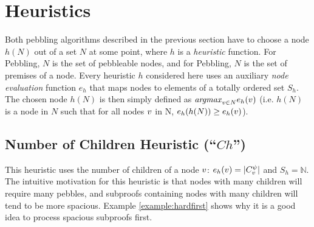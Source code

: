\documentclass{llncs}
\begin{document}
\section{Heuristics}
\label{sec:heuristics}

Both pebbling algorithms described in the previous section have to choose a node $h(N)$ out of a set $N$ at some point, where $h$ is a \emph{heuristic} function. For  Pebbling, $N$ is the set of pebbleable nodes, and for  Pebbling, $N$ is the set of premises of a node. Every heuristic $h$ considered here uses an auxiliary \emph{node evaluation} function $e_h$ that maps nodes to elements of a totally ordered set $S_h$. The chosen node $h(N)$ is then simply defined as $\mathit{argmax}_{v \in N} e_h(v)$ (i.e. $h(N)$ is a node in $N$ such that for all nodes $v$ in N, $e_h(h(N)) \geq e_h(v)$).

\subsection{Number of Children Heuristic (``$Ch$'')}
\label{sec:children}
This heuristic uses the number of children of a node $v$: $e_h(v) = |C_{v}^{\psi}|$ and $S_h = \mathbb{N}$.
The intuitive motivation for this heuristic is that nodes with many children will require many pebbles, and subproofs containing nodes with many children will tend to be more spacious. Example \ref{example:hardfirst} shows why it is a good idea to process spacious subproofs first.
\end{document}
